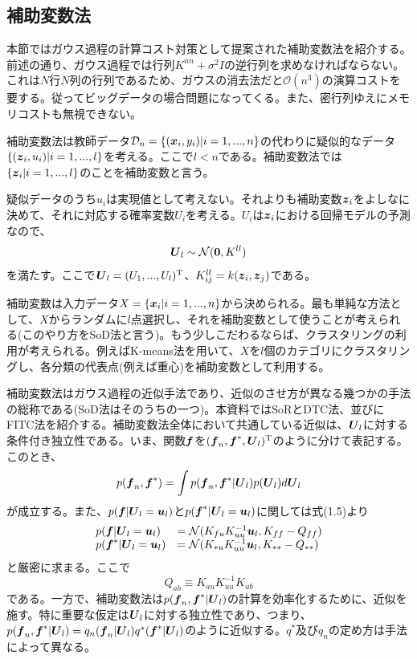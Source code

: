 \documentclass[dvipdfmx, 9pt, a4paper]{jsarticle}
\numberwithin{equation}{section}
\newcommand{\bm}[1]{{\mbox{\boldmath $#1$}}}
\begin{document}
\subsection{補助変数法}
本節ではガウス過程の計算コスト対策として提案された補助変数法を紹介する。前述の通り、ガウス過程では行列$K^{nn}+\sigma^2I$の逆行列を求めなければならない。これは$N$行$N$列の行列であるため、ガウスの消去法だと$\mathcal{O}(n^3)$の演算コストを要する。従ってビッグデータの場合問題になってくる。また、密行列ゆえにメモリコストも無視できない。\par
補助変数法は教師データ$\mathcal{D}_n=\{(\bm x_i, y_i)|i=1,...,n\}$の代わりに疑似的なデータ$\{(\bm z_i, u_i)|i=1,...,l\}$を考える。ここで$l<n$である。補助変数法では$\{\bm z_i|i=1,...,l\}$のことを補助変数と言う。\par
疑似データのうち$u_i$は実現値として考えない。それよりも補助変数$\bm z_i$をよしなに決めて、それに対応する確率変数$U_i$を考える。$U_i$は$\bm z_i$における回帰モデルの予測なので、
\begin{equation}
\bm U_l \sim \mathcal{N}(\bm 0, K^{ll})
\end{equation}
を満たす。ここで$\bm U_l=(U_1, ..., U_l)^{\rm T}$、$K^{ll}_{ij}=k(\bm z_i, \bm z_j)$である。\par
補助変数は入力データ$X=\{\bm x_i|i=1,...,n\}$から決められる。最も単純な方法として、$X$からランダムに$l$点選択し、それを補助変数として使うことが考えられる(このやり方をSoD法と言う)。もう少しこだわるならば、クラスタリングの利用が考えられる。例えばK-means法を用いて、$X$を$l$個のカテゴリにクラスタリングし、各分類の代表点(例えば重心)を補助変数として利用する。\par
補助変数法はガウス過程の近似手法であり、近似のさせ方が異なる幾つかの手法の総称である(SoD法はそのうちの一つ)。本資料ではSoRとDTC法、並びにFITC法を紹介する。補助変数法全体において共通している近似は、$\bm U_l$に対する条件付き独立性である。いま、関数$\bm f$を$(\bm f_n, \bm f^*, \bm U_l)^{\rm T}$のように分けて表記する。このとき、
\begin{equation}
p(\bm f_n, \bm f^*)=\int p(\bm f_n, \bm f^*|\bm U_l)p(\bm U_l)d\bm U_l \notag
\end{equation}
が成立する。また、$p(\bm f|\bm U_l=\bm u_l)$と$p(\bm f^*|\bm U_l=\bm u_l)$に関しては式(1.5)より
\begin{equation}
\begin{array}{ll}
p(\bm f|\bm U_l=\bm u_l) & = \mathcal{N}(K_{fu}K_{uu}^{-1}\bm u_l, K_{ff}-Q_{ff}) \\
p(\bm f^*|\bm U_l=\bm u_l) & = \mathcal{N}(K_{*u}K_{uu}^{-1}\bm u_l, K_{**}-Q_{**})
\end{array} \notag
\end{equation}
と厳密に求まる。ここで
\begin{equation}
Q_{ab} \equiv K_{au}K^{-1}_{uu}K_{ub}
\end{equation}
である。一方で、補助変数法は$p(\bm f_n, \bm f^*|\bm U_l)$の計算を効率化するために、近似を施す。特に重要な仮定は$\bm U_l$に対する独立性であり、つまり、$p(\bm f_n, \bm f^*|\bm U_l)=q_n(\bm f_n|\bm U_l)q^*(\bm f^*|\bm U_l)$のように近似する。$q^*$及び$q_n$の定め方は手法によって異なる。
\end{document}
